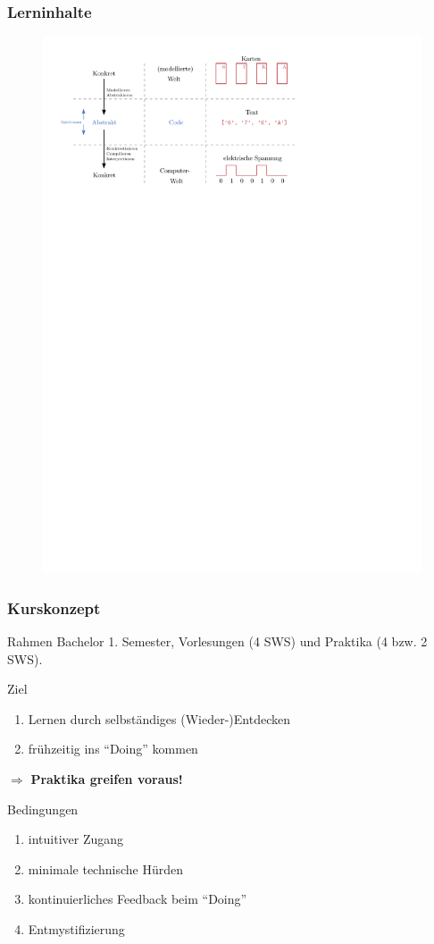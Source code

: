 \documentclass[german,aspectratio=169]{beamer}
\begin{document}
\begin{frame}
	\frametitle{Lerninhalte}
	\begin{center}
		\begin{figure}
			\includegraphics[width=0.9\linewidth]{./figs/world-code-computer}
		\end{figure}
	\end{center}
\end{frame}

\begin{frame}
	\frametitle{Kurskonzept}
	\begin{block}{Rahmen}
		Bachelor 1. Semester, Vorlesungen (4 SWS) und Praktika (4 bzw. 2 SWS).
	\end{block}
	\begin{block}{Ziel}
		\begin{enumerate}[label = $\bullet$]
			\item Lernen durch selbständiges (Wieder-)Entdecken
			\item frühzeitig ins ``Doing'' kommen
		\end{enumerate}
	 $\Rightarrow$ \textbf{Praktika greifen voraus!}
	\end{block}
	\begin{block}{Bedingungen}
		\begin{enumerate}[label = $\bullet$]
			\item intuitiver Zugang
			\item minimale technische Hürden
			\item kontinuierliches Feedback beim ``Doing''
			\item Ent­mys­ti­fi­zie­rung
		\end{enumerate}
	\end{block}
\end{frame}
\end{document}
